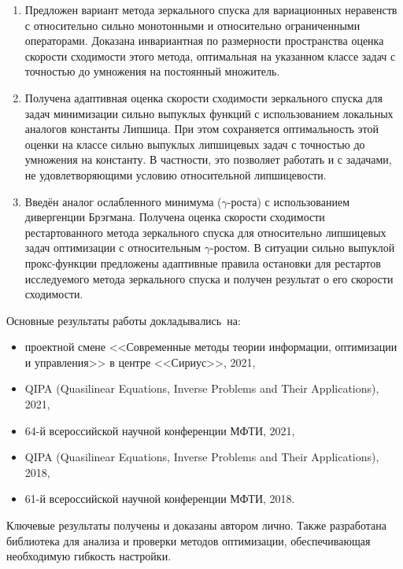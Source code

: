 {}
\begin{enumerate}[beginpenalty=10000] %
  \item Предложен вариант метода зеркального спуска для вариационных неравенств с относительно сильно монотонными и относительно ограниченными операторами. Доказана инвариантная по размерности пространства оценка скорости сходимости этого метода, оптимальная на указанном классе задач с точностью до умножения на постоянный множитель.
  \item Получена адаптивная оценка скорости сходимости зеркального спуска для задач минимизации сильно выпуклых функций с использованием локальных аналогов константы Липшица. При этом сохраняется оптимальность этой оценки на классе сильно выпуклых липшицевых задач с точностью до умножения на константу. В частности, это позволяет работать и с задачами, не удовлетворяющими условию относительной липшицевости.
  \item Введён аналог ослабленного минимума ($\gamma$-роста) с использованием дивергенции Брэгмана. Получена оценка скорости сходимости рестартованного метода зеркального спуска для относительно липшицевых задач оптимизации с относительным $\gamma$-ростом. В ситуации сильно выпуклой прокс-функции предложены адаптивные правила остановки для рестартов исследуемого метода зеркального спуска и получен результат о его скорости сходимости.
\end{enumerate}

{\probation}
Основные результаты работы докладывались~на:
\begin{itemize}
    \item проектной смене <<Современные методы теории информации, оптимизации и управления>> в центре <<Сириус>>, 2021,
    \item QIPA (Quasilinear Equations, Inverse Problems and Their Applications), 2021,
    \item 64-й всероссийской научной конференции МФТИ, 2021,
    \item QIPA (Quasilinear Equations, Inverse Problems and Their Applications), 2018,
    \item 61-й всероссийской научной конференции МФТИ, 2018.
\end{itemize}

{\contribution} Ключевые результаты получены и доказаны автором лично. Также разработана библиотека для анализа и проверки методов оптимизации, обеспечивающая необходимую гибкость настройки. 

